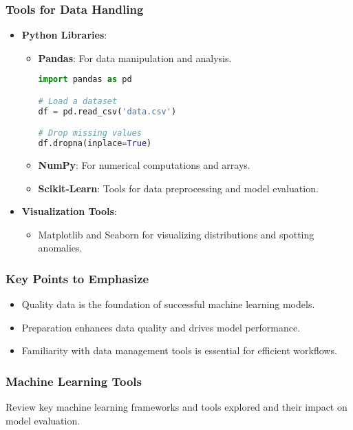 \documentclass[aspectratio=169]{beamer}
\begin{document}
\begin{frame}[fragile]
    \frametitle{Tools for Data Handling}
    \begin{itemize}
        \item \textbf{Python Libraries}:
        \begin{itemize}
            \item \textbf{Pandas}: For data manipulation and analysis.
            \begin{lstlisting}[language=Python]
import pandas as pd

# Load a dataset
df = pd.read_csv('data.csv')

# Drop missing values
df.dropna(inplace=True)
            \end{lstlisting}
            \item \textbf{NumPy}: For numerical computations and arrays.
            \item \textbf{Scikit-Learn}: Tools for data preprocessing and model evaluation.
        \end{itemize}
        \item \textbf{Visualization Tools}:
        \begin{itemize}
            \item Matplotlib and Seaborn for visualizing distributions and spotting anomalies.
        \end{itemize}
    \end{itemize}
\end{frame}

\begin{frame}[fragile]
    \frametitle{Key Points to Emphasize}
    \begin{itemize}
        \item Quality data is the foundation of successful machine learning models.
        \item Preparation enhances data quality and drives model performance.
        \item Familiarity with data management tools is essential for efficient workflows.
    \end{itemize}
\end{frame}

\begin{frame}
    \frametitle{Machine Learning Tools}
    Review key machine learning frameworks and tools explored and their impact on model evaluation.
\end{frame}
\end{document}
